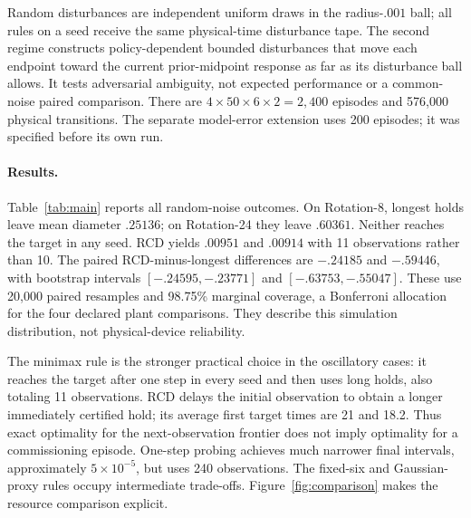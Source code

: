 \documentclass{l4dc2026}
\begin{document}
Random disturbances are independent uniform draws in the radius-$.001$ ball; all rules on a seed receive the same physical-time disturbance tape. The second regime constructs policy-dependent bounded disturbances that move each endpoint toward the current prior-midpoint response as far as its disturbance ball allows. It tests adversarial ambiguity, not expected performance or a common-noise paired comparison. There are $4\times50\times6\times2=2,400$ episodes and 576,000 physical transitions. The separate model-error extension uses 200 episodes; it was specified before its own run.

\paragraph{Results.}
Table~\ref{tab:main} reports all random-noise outcomes. On Rotation-8, longest holds leave mean diameter $.25136$; on Rotation-24 they leave $.60361$. Neither reaches the target in any seed. RCD yields $.00951$ and $.00914$ with 11 observations rather than 10. The paired RCD-minus-longest differences are $-.24185$ and $-.59446$, with bootstrap intervals $[-.24595,-.23771]$ and $[-.63753,-.55047]$. These use 20,000 paired resamples and 98.75\% marginal coverage, a Bonferroni allocation for the four declared plant comparisons. They describe this simulation distribution, not physical-device reliability.

\begin{table}[t]
\centering\small
\caption{Random disturbances: means over 50 seeds; diameter includes sample standard deviation. ``Time resolved'' is the fraction of physical steps whose most recently observed interval has width at most $.08$. All six rules are retained.}\label{tab:main}

\end{table}

The minimax rule is the stronger practical choice in the oscillatory cases: it reaches the target after one step in every seed and then uses long holds, also totaling 11 observations. RCD delays the initial observation to obtain a longer immediately certified hold; its average first target times are 21 and 18.2. Thus exact optimality for the next-observation frontier does not imply optimality for a commissioning episode. One-step probing achieves much narrower final intervals, approximately $5\times10^{-5}$, but uses 240 observations. The fixed-six and Gaussian-proxy rules occupy intermediate trade-offs. Figure~\ref{fig:comparison} makes the resource comparison explicit.
\end{document}
